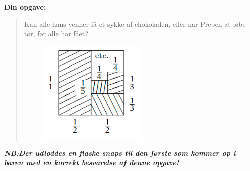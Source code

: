 \textbf{Din opgave:}
\begin{quote}
\noindent Kan alle hans venner få et sykke af chokoladen, eller når Preben at
løbe tør, før alle har fået?
\begin{figure}[h]
    \centering
    \includegraphics[width=0.5\textwidth]{preben.png}
\end{figure}
\end{quote}

\textbf{\emph{NB:\@ Der udloddes en flaske snaps til den første som kommer op i
baren med en korrekt besvarelse af denne opgave!}}

